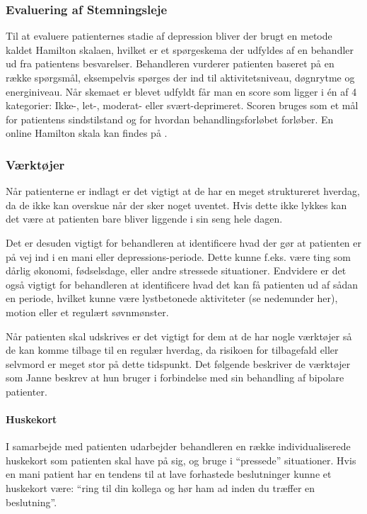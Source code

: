 \subsubsection{Evaluering af Stemningsleje}
Til at evaluere patienternes stadie af depression bliver der brugt en metode kaldet Hamilton skalaen, hvilket er et spørgeskema der udfyldes af en behandler ud fra patientens besvarelser. 
Behandleren vurderer patienten baseret på en række spørgsmål, eksempelvis spørges der ind til aktivitetsniveau, døgnrytme og energiniveau.
Når skemaet er blevet udfyldt får man en score som ligger i én af 4 kategorier: Ikke-, let-, moderat- eller svært-deprimeret. 
Scoren bruges som et mål for patientens sindstilstand og for hvordan behandlingsforløbet forløber.
En online Hamilton skala kan findes på \citet{hamilton}.

\subsubsection{Værktøjer}
Når patienterne er indlagt er det vigtigt at de har en meget struktureret hverdag, da de ikke kan overskue når der sker noget uventet.
Hvis dette ikke lykkes kan det være at patienten bare bliver liggende i sin seng hele dagen.

Det er desuden vigtigt for behandleren at identificere hvad der gør at patienten er på vej ind i en mani eller depressions-periode.
Dette kunne f.eks. være ting som dårlig økonomi, fødselsdage, eller andre stressede situationer.
Endvidere er det også vigtigt for behandleren at identificere hvad det kan få patienten ud af sådan en periode, hvilket kunne være lystbetonede aktiviteter (se nedenunder her), motion eller et regulært søvnmønster.

Når patienten skal udskrives er det vigtigt for dem at de har nogle værktøjer så de kan komme tilbage til en regulær hverdag, da risikoen for tilbagefald eller selvmord er meget stor på dette tidspunkt. 
Det følgende beskriver de værktøjer som Janne beskrev at hun bruger i forbindelse med sin behandling af bipolare patienter.

\paragraph{Huskekort}
I samarbejde med patienten udarbejder behandleren en række individualiserede huskekort som patienten skal have på sig, og bruge i ``pressede'' situationer. 
Hvis en mani patient har en tendens til at lave forhastede beslutninger kunne et huskekort være: ``ring til din kollega og hør ham ad inden du træffer en beslutning''.

